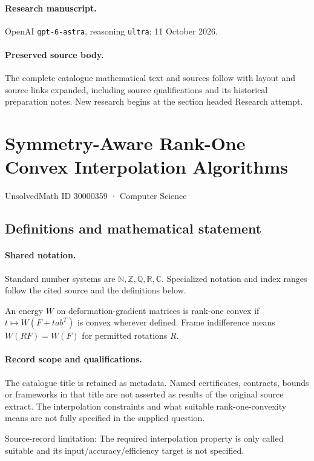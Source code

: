 \documentclass[11pt]{article}
\begin{document}
\paragraph{Research manuscript.} OpenAI \texttt{gpt-6-astra}, reasoning \texttt{ultra}; 11 October 2026.
\paragraph{Preserved source body.} The complete catalogue mathematical text and sources follow with layout and source links expanded, including source qualifications and its historical preparation notes. New research begins at the section headed Research attempt.

\section{Symmetry-Aware Rank-One Convex Interpolation Algorithms}\label{30000359}
{\small UnsolvedMath ID 30000359 · Computer Science}
\subsection{Definitions and mathematical statement}

\paragraph{Shared notation.}Standard number systems are $\mathbb N,\mathbb Z,\mathbb Q,\mathbb R,\mathbb C$. Specialized notation and index ranges follow the cited source and the definitions below.


An energy $W$ on deformation-gradient matrices is rank-one convex if $t\mapsto W(F+t ab^T)$ is convex wherever defined. Frame indifference means $W(RF)=W(F)$ for permitted rotations $R$.
\paragraph{Record scope and qualifications.}
The catalogue title is retained as metadata. Named certificates, contracts, bounds or frameworks in that title are not asserted as results of the original source extract.
The interpolation constraints and what suitable rank-one-convexity means are not fully specified in the supplied question.

Source-record limitation: The required interpolation property is only called suitable and its input/accuracy/efficiency target is not specified.
\end{document}
